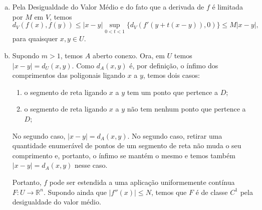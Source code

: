 \documentclass[12pt,a4paper]{article}
\newcommand{\R}{\mathbb{R}}
\begin{document}
\begin{enumerate}[a)]
        \item Pela Desigualdade do Valor Médio e do fato que a derivada de $f$
        é limitada por $M$ em $V$, temos
        \begin{equation*}
            d_V(f(x), f(y)) \leq |x-y| \sup_{0<t<1} \{ d_V(f'(y + t(x-y)), 0) \}
                            \leq M |x-y|,
        \end{equation*}
        para quaisquer $x,y\in U$.
        
        \item Supondo $m>1$, temos $A$ aberto conexo.
        Ora, em $U$ temos $|x-y| = d_U(x,y)$. Como $d_A(x,y)$ é,
        por definição, o ínfimo dos comprimentos das poligonais
        ligando $x$ a $y$, temos dois casos:
        \begin{enumerate}
            \item o segmento de reta ligando $x$ a $y$ tem
            um ponto que pertence a $D$;
            \item o segmento de reta ligando $x$ a $y$ não tem
            nenhum ponto que pertence a $D$;
        \end{enumerate}
        No segundo caso, $|x-y| = d_A(x,y)$. No segundo caso, 
        retirar uma quantidade enumerável de pontos de um
        segmento de reta não muda o seu comprimento e,
        portanto, o ínfimo se mantém o mesmo e temos também
        $|x-y| = d_A(x,y)$ nesse caso.
        
        Portanto, $f$ pode ser estendida a uma aplicação 
        uniformemente contínua $F:U\to\R^n$. Supondo ainda 
        que $|f''(x)| \leq N$, temos que $F$ é de classe $C^1$
        pela desigualdade do valor médio.
    \end{enumerate}
\end{document}
